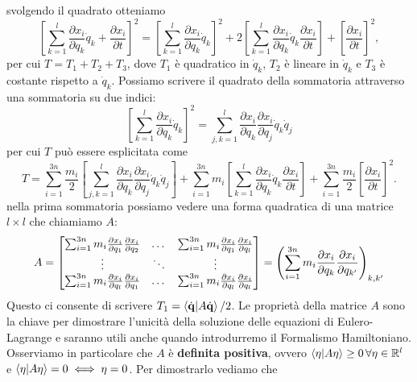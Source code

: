     svolgendo il quadrato otteniamo
    \begin{equation}
    \left[\sum_{k=1}^l \frac{\partial x_i}{\partial q_k}\dot{q}_k + \frac{\partial x_i}{\partial t}\right]^2 = \left[\sum_{k=1}^l \frac{\partial x_i}{\partial q_k}\dot{q}_k\right]^2 +
    2\left[\sum_{k=1}^l \frac{\partial x_i}{\partial q_k}\dot{q}_k\frac{\partial x_i}{\partial t}\right]+   
    \left[\frac{\partial x_i}{\partial t}\right]^2,
    \end{equation}
    per cui $T=T_1+T_2+T_3$, dove $T_1$ è quadratico in $\dot{q}_k$, $T_2$ è lineare in $\dot{q}_k$ e $T_3$ è costante rispetto a $\dot{q}_k$. Possiamo scrivere il quadrato della sommatoria attraverso una sommatoria su due indici:
    \begin{equation}
         \left[\sum_{k=1}^l \frac{\partial x_i}{\partial q_k}\dot{q}_k\right]^2 = \sum_{j,k=1}^{l} \frac{\partial x_i}{\partial q_k}\frac{\partial x_i}{\partial q_j}\dot{q}_k\dot{q}_j
         \label{quadrato della sommatoria}
    \end{equation}
    per cui $T$ può essere esplicitata come
    \begin{equation}
        T = \sum_{i=1}^{3n}\frac{m_i}{2}\left[\sum_{j,k=1}^{l} \frac{\partial x_i}{\partial q_k}\frac{\partial x_i}{\partial q_j}\dot{q}_k\dot{q}_j\right]+ \sum_{i=1}^{3n}m_i\left[\sum_{k=1}^l \frac{\partial x_i}{\partial q_k}\dot{q}_k\frac{\partial x_i}{\partial t}\right]+ \sum_{i=1}^{3n}\frac{m_i}{2}\left[\frac{\partial x_i}{\partial t}\right]^2.
    \end{equation}
    nella prima sommatoria possiamo vedere una forma quadratica di una matrice $l\times l$ che chiamiamo $A$:
    \begin{equation}
    A=
            \begin{bmatrix}
                \sum_{i=1}^{3n}m_i\frac{\partial x_i}{\partial q_1}\frac{\partial x_i}{\partial q_2}& \dots & \sum_{i=1}^{3n}m_i\frac{\partial x_i}{\partial q_1}\frac{\partial x_i}{\partial q_l}\\
                \vdots& \ddots &\vdots\\ 
                \sum_{i=1}^{3n}m_i\frac{\partial x_i}{\partial q_l}\frac{\partial x_i}{\partial q_1} & \dots& \sum_{i=1}^{3n}m_i\frac{\partial x_i}{\partial q_l}\frac{\partial x_i}{\partial q_l}
        \end{bmatrix} = \left(\sum_{i=1}^{3n} m_i \frac{\partial x_i}{\partial q_k}\frac{\partial {x_i}}{{\partial q_{k'}}}\right)_{k,k'}
    \end{equation}
    Questo ci consente di scrivere $T_1 = \braket{\dot{\mathbf{q}}|A\dot{\mathbf{q}}}/2$. Le proprietà della matrice $A$ sono la chiave per dimostrare l'unicità della soluzione delle equazioni di Eulero-Lagrange e saranno utili anche quando introdurremo il Formalismo Hamiltoniano. Osserviamo in particolare che  $A$ è \textbf{definita positiva}, ovvero $\braket{\eta|A\eta}\geq0\,\forall \eta \in \mathbb{R}^{l}$ e $\braket{\eta|A\eta}=0 \iff \eta =0$. Per dimostrarlo vediamo che
